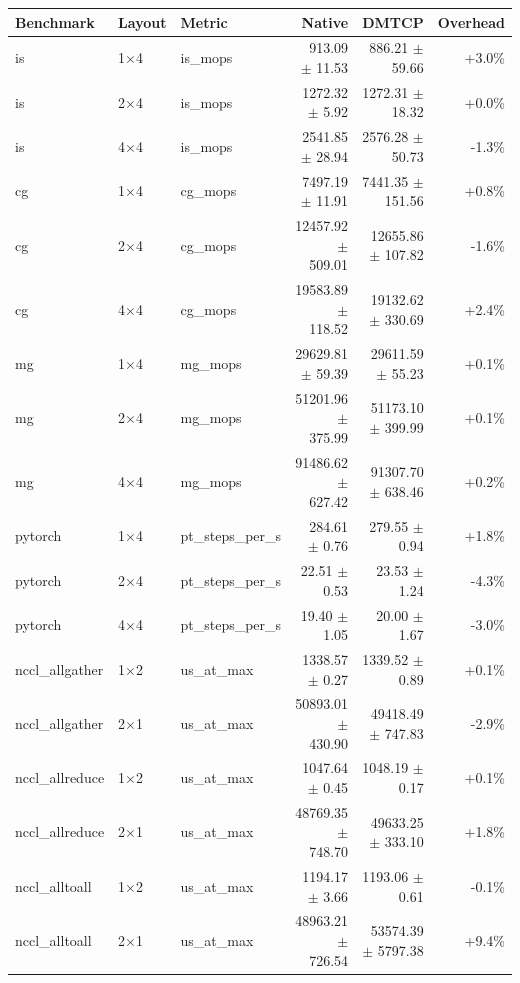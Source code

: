 \begin{tabular}{lllrrr}
\toprule
Benchmark & Layout & Metric & Native & DMTCP & Overhead \\
\midrule
is & 1$\times$4 & is\_mops & 913.09 $\pm$ 11.53 & 886.21 $\pm$ 59.66 & +3.0\% \\
is & 2$\times$4 & is\_mops & 1272.32 $\pm$ 5.92 & 1272.31 $\pm$ 18.32 & +0.0\% \\
is & 4$\times$4 & is\_mops & 2541.85 $\pm$ 28.94 & 2576.28 $\pm$ 50.73 & -1.3\% \\
cg & 1$\times$4 & cg\_mops & 7497.19 $\pm$ 11.91 & 7441.35 $\pm$ 151.56 & +0.8\% \\
cg & 2$\times$4 & cg\_mops & 12457.92 $\pm$ 509.01 & 12655.86 $\pm$ 107.82 & -1.6\% \\
cg & 4$\times$4 & cg\_mops & 19583.89 $\pm$ 118.52 & 19132.62 $\pm$ 330.69 & +2.4\% \\
mg & 1$\times$4 & mg\_mops & 29629.81 $\pm$ 59.39 & 29611.59 $\pm$ 55.23 & +0.1\% \\
mg & 2$\times$4 & mg\_mops & 51201.96 $\pm$ 375.99 & 51173.10 $\pm$ 399.99 & +0.1\% \\
mg & 4$\times$4 & mg\_mops & 91486.62 $\pm$ 627.42 & 91307.70 $\pm$ 638.46 & +0.2\% \\
pytorch & 1$\times$4 & pt\_steps\_per\_s & 284.61 $\pm$ 0.76 & 279.55 $\pm$ 0.94 & +1.8\% \\
pytorch & 2$\times$4 & pt\_steps\_per\_s & 22.51 $\pm$ 0.53 & 23.53 $\pm$ 1.24 & -4.3\% \\
pytorch & 4$\times$4 & pt\_steps\_per\_s & 19.40 $\pm$ 1.05 & 20.00 $\pm$ 1.67 & -3.0\% \\
nccl\_allgather & 1$\times$2 & us\_at\_max & 1338.57 $\pm$ 0.27 & 1339.52 $\pm$ 0.89 & +0.1\% \\
nccl\_allgather & 2$\times$1 & us\_at\_max & 50893.01 $\pm$ 430.90 & 49418.49 $\pm$ 747.83 & -2.9\% \\
nccl\_allreduce & 1$\times$2 & us\_at\_max & 1047.64 $\pm$ 0.45 & 1048.19 $\pm$ 0.17 & +0.1\% \\
nccl\_allreduce & 2$\times$1 & us\_at\_max & 48769.35 $\pm$ 748.70 & 49633.25 $\pm$ 333.10 & +1.8\% \\
nccl\_alltoall & 1$\times$2 & us\_at\_max & 1194.17 $\pm$ 3.66 & 1193.06 $\pm$ 0.61 & -0.1\% \\
nccl\_alltoall & 2$\times$1 & us\_at\_max & 48963.21 $\pm$ 726.54 & 53574.39 $\pm$ 5797.38 & +9.4\% \\

\end{tabular}
